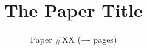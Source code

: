 \documentclass[letterpaper,twocolumn,10pt]{article}
\newcommand{\sys}{\textsc{Dash}\xspace}
\begin{document}
\date{}

\title{\textbf{\sffamily The Paper Title}}

\author{Paper \#XX (+{\number\numexpr{}-} pages)}

\maketitle

















\label{beforerefs}

{


}
\end{document}
